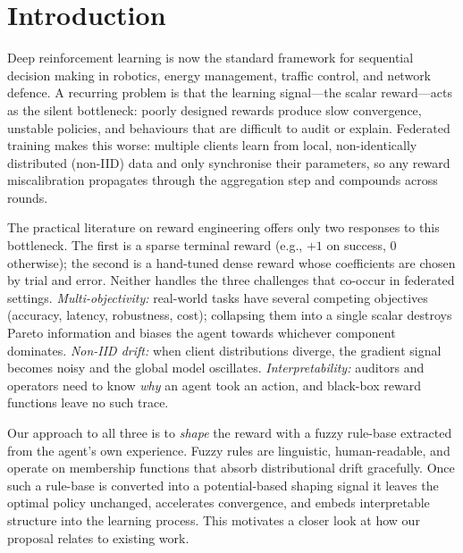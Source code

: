 \documentclass[ai,article,submit,moreauthors,pdftex]{Definitions/mdpi}
\begin{document}
\section{Introduction}\label{sec:introduction}

Deep reinforcement learning is now the standard framework for
sequential decision making in robotics, energy management, traffic
control, and network defence\cite{lecun2015deep,arrieta2020xai}. A
recurring problem is that the learning signal---the scalar
reward---acts as the silent bottleneck: poorly designed rewards
produce slow convergence, unstable policies, and behaviours that are
difficult to audit or explain\cite{ferrag2020deep}. Federated
training makes this worse: multiple clients learn from local,
non-identically distributed (non-IID) data and only synchronise their
parameters, so any reward miscalibration propagates through the
aggregation step and compounds across rounds\cite{mcmahan2017fedavg,
li2020fedprox,kairouz2021advances,zhao2018noniid}.

The practical literature on reward engineering offers only two
responses to this bottleneck. The first is a sparse terminal reward
(e.g., $+1$ on success, $0$ otherwise); the second is a hand-tuned
dense reward whose coefficients are chosen by trial and error.
Neither handles the three challenges that co-occur in federated
settings. \emph{Multi-objectivity:} real-world tasks have several
competing objectives (accuracy, latency, robustness, cost); collapsing
them into a single scalar destroys Pareto information and biases the
agent towards whichever component dominates\cite{li2022review}.
\emph{Non-IID drift:} when client distributions diverge, the gradient
signal becomes noisy and the global model oscillates\cite{li2020fedprox,
li2024federated_noniid}. \emph{Interpretability:} auditors and
operators need to know \emph{why} an agent took an action, and
black-box reward functions leave no such trace\cite{lundberg2017shap,
ribeiro2016lime,arrieta2020xai}.

Our approach to all three is to \emph{shape} the reward with a fuzzy
rule-base extracted from the agent's own experience. Fuzzy rules are
linguistic, human-readable, and operate on membership functions that
absorb distributional drift gracefully. Once such a rule-base is
converted into a potential-based shaping signal it leaves the optimal
policy unchanged\cite{ng1999policy_invariance}, accelerates
convergence, and embeds interpretable structure into the learning
process. This motivates a closer look at how our proposal relates to
existing work.
\end{document}
